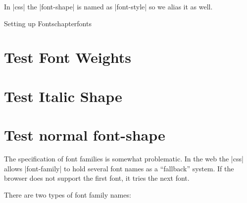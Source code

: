 In |css| the |font-shape| is named as |font-style| so we alias it as well. 



\begin{texexample}{Setting up Fonts}{chapterfonts}
\chapter[fonts]{Test Font Weights}
\lorem
{}
\chapter{Test Italic Shape}
\lorem
{}
\chapter{Test normal font-shape}
\lorem
\end{texexample}



The specification of font families is somewhat problematic. In the web the |css| allows |font-family|  to hold several font names as a ``fallback” system. If the browser does not support the first font, it tries the next font.

There are two types of font family names:

